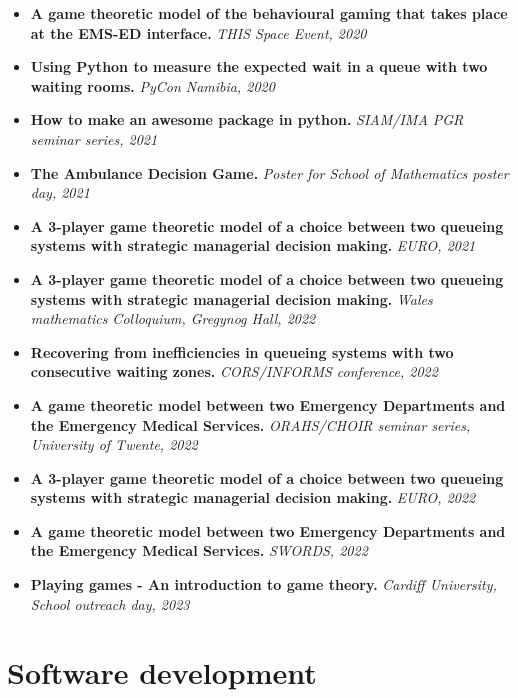 \begin{itemize}
    \item \textbf{A game theoretic model of the behavioural gaming that takes
    place at the EMS-ED interface.} \emph{THIS Space Event, 2020}
    \item \textbf{Using Python to measure the expected wait in a queue with two
    waiting rooms.} \emph{PyCon Namibia, 2020}
    \item \textbf{How to make an awesome package in python.} \emph{SIAM/IMA PGR
    seminar series, 2021}
    \item \textbf{The Ambulance Decision Game.} \emph{Poster for School of
    Mathematics poster day, 2021}
    \item \textbf{A 3-player game theoretic model of a choice between two
    queueing systems with strategic managerial decision making.}
    \emph{EURO, 2021}
    \item \textbf{A 3-player game theoretic model of a choice between two
    queueing systems with strategic managerial decision making.}
    \emph{Wales mathematics Colloquium, Gregynog Hall, 2022}
    \item \textbf{Recovering from inefficiencies in queueing systems with two
    consecutive waiting zones.} \emph{CORS/INFORMS conference, 2022}
    \item \textbf{A game theoretic model between two Emergency Departments and
    the Emergency Medical Services.}
    \emph{ORAHS/CHOIR seminar series, University of Twente, 2022}
    \item \textbf{A 3-player game theoretic model of a choice between two
    queueing systems with strategic managerial decision making.}
    \emph{EURO, 2022}
    \item \textbf{A game theoretic model between two Emergency Departments and
    the Emergency Medical Services.} \emph{SWORDS, 2022}
    \item \textbf{Playing games - An introduction to game theory.}
    \emph{Cardiff University, School outreach day, 2023}
\end{itemize}

\section*{Software development}

